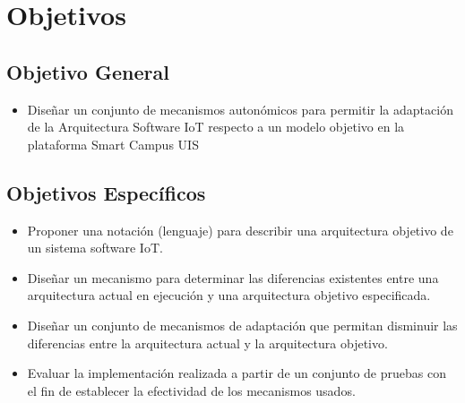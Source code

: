 \section{Objetivos}
\subsection{Objetivo General}
\begin{itemize}

    \item Diseñar un conjunto de mecanismos autonómicos para permitir la adaptación de la Arquitectura Software IoT respecto a un modelo objetivo en la plataforma Smart Campus UIS

\end{itemize}

\subsection{Objetivos Específicos}

\begin{itemize}
    \item Proponer una notación (lenguaje) para describir una arquitectura objetivo de un sistema software IoT.
    \item Diseñar un mecanismo para determinar las diferencias existentes entre una arquitectura actual en ejecución y una arquitectura objetivo especificada.
    \item Diseñar un conjunto de mecanismos de adaptación que permitan disminuir las diferencias entre la arquitectura actual y la arquitectura objetivo.
    \item Evaluar la implementación realizada a partir de un conjunto de pruebas con el fin de establecer la efectividad de los mecanismos usados.
\end{itemize}